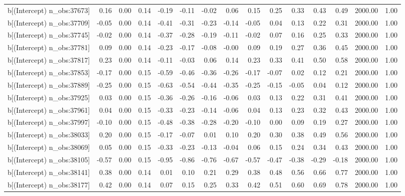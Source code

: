 \begin{table}[ht]
\begin{tabular}{rrrrrrrrrrrrrrr}
  b[(Intercept) n\_obs:37673] & 0.16 & 0.00 & 0.14 & -0.19 & -0.11 & -0.02 & 0.06 & 0.15 & 0.25 & 0.33 & 0.43 & 0.49 & 2000.00 & 1.00 \\ 
  b[(Intercept) n\_obs:37709] & -0.05 & 0.00 & 0.14 & -0.41 & -0.31 & -0.23 & -0.14 & -0.05 & 0.04 & 0.13 & 0.22 & 0.31 & 2000.00 & 1.00 \\ 
  b[(Intercept) n\_obs:37745] & -0.02 & 0.00 & 0.14 & -0.37 & -0.28 & -0.19 & -0.11 & -0.02 & 0.07 & 0.16 & 0.25 & 0.33 & 2000.00 & 1.00 \\ 
  b[(Intercept) n\_obs:37781] & 0.09 & 0.00 & 0.14 & -0.23 & -0.17 & -0.08 & -0.00 & 0.09 & 0.19 & 0.27 & 0.36 & 0.45 & 2000.00 & 1.00 \\ 
  b[(Intercept) n\_obs:37817] & 0.23 & 0.00 & 0.14 & -0.11 & -0.03 & 0.06 & 0.14 & 0.23 & 0.33 & 0.41 & 0.50 & 0.58 & 2000.00 & 1.00 \\ 
  b[(Intercept) n\_obs:37853] & -0.17 & 0.00 & 0.15 & -0.59 & -0.46 & -0.36 & -0.26 & -0.17 & -0.07 & 0.02 & 0.12 & 0.21 & 2000.00 & 1.00 \\ 
  b[(Intercept) n\_obs:37889] & -0.25 & 0.00 & 0.15 & -0.63 & -0.54 & -0.44 & -0.35 & -0.25 & -0.15 & -0.05 & 0.04 & 0.12 & 2000.00 & 1.00 \\ 
  b[(Intercept) n\_obs:37925] & 0.03 & 0.00 & 0.15 & -0.36 & -0.26 & -0.16 & -0.06 & 0.03 & 0.13 & 0.22 & 0.31 & 0.41 & 2000.00 & 1.00 \\ 
  b[(Intercept) n\_obs:37961] & 0.04 & 0.00 & 0.15 & -0.33 & -0.23 & -0.14 & -0.06 & 0.04 & 0.13 & 0.23 & 0.32 & 0.43 & 2000.00 & 1.00 \\ 
  b[(Intercept) n\_obs:37997] & -0.10 & 0.00 & 0.15 & -0.48 & -0.38 & -0.28 & -0.20 & -0.10 & 0.00 & 0.09 & 0.19 & 0.27 & 2000.00 & 1.00 \\ 
  b[(Intercept) n\_obs:38033] & 0.20 & 0.00 & 0.15 & -0.17 & -0.07 & 0.01 & 0.10 & 0.20 & 0.30 & 0.38 & 0.49 & 0.56 & 2000.00 & 1.00 \\ 
  b[(Intercept) n\_obs:38069] & 0.05 & 0.00 & 0.15 & -0.33 & -0.23 & -0.13 & -0.04 & 0.06 & 0.15 & 0.24 & 0.34 & 0.43 & 2000.00 & 1.00 \\ 
  b[(Intercept) n\_obs:38105] & -0.57 & 0.00 & 0.15 & -0.95 & -0.86 & -0.76 & -0.67 & -0.57 & -0.47 & -0.38 & -0.29 & -0.18 & 2000.00 & 1.00 \\ 
  b[(Intercept) n\_obs:38141] & 0.38 & 0.00 & 0.14 & 0.01 & 0.10 & 0.21 & 0.29 & 0.38 & 0.48 & 0.56 & 0.66 & 0.77 & 2000.00 & 1.00 \\ 
  b[(Intercept) n\_obs:38177] & 0.42 & 0.00 & 0.14 & 0.07 & 0.15 & 0.25 & 0.33 & 0.42 & 0.51 & 0.60 & 0.69 & 0.78 & 2000.00 & 1.00 \\ 

\end{tabular}
\end{table}

